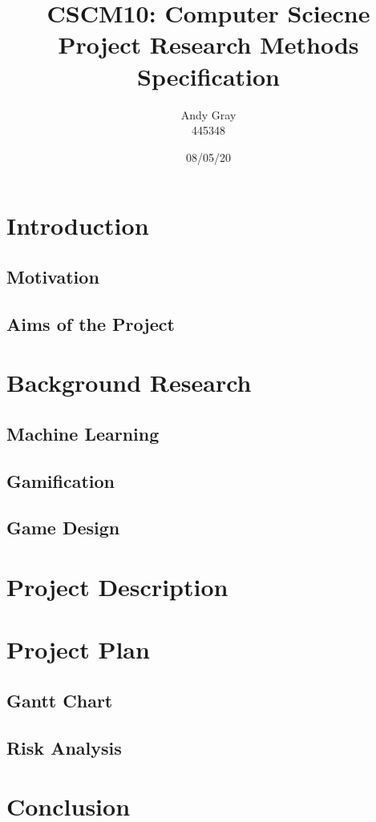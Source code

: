 \documentclass[a4paper,10pt]{article}
\begin{document}
\title{\textbf{CSCM10: Computer Sciecne Project Research Methods \\Specification}}
\date{08/05/20}
\author{Andy Gray\\445348}

\maketitle

\begin{abstract}
	\lipsum[1]
\end{abstract}

\section{Introduction}
	\lipsum[1]

\subsection{Motivation}
	\lipsum[1]
\subsection{Aims of the Project}
	\lipsum[1]
\section{Background Research}
	\lipsum[1]
\subsection{Machine Learning}
	\lipsum[1]

\subsection{Gamification}
	\lipsum[1]

\subsection{Game Design}
	\lipsum[1]

\section{Project Description}
	\lipsum[1]

\section{Project Plan}
	\lipsum[1]
\subsection{Gantt Chart}
	\lipsum[1]
\subsection{Risk Analysis}
	\lipsum[1]


\section{Conclusion}
	\lipsum[1]


\medskip
\newpage


\end{document}
